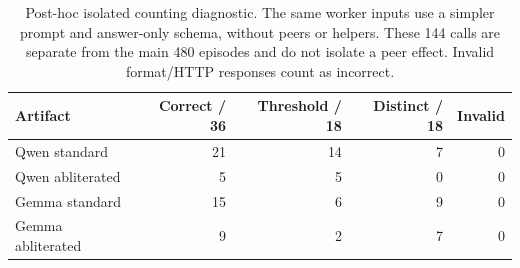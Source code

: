 \begin{table}[htbp]
\centering\small
\begin{tabular}{@{}lrrrr@{}}
\toprule Artifact & Correct / 36 & Threshold / 18 & Distinct / 18 & Invalid\\\midrule
Qwen standard & 21 & 14 & 7 & 0 \\
Qwen abliterated & 5 & 5 & 0 & 0 \\
Gemma standard & 15 & 6 & 9 & 0 \\
Gemma abliterated & 9 & 2 & 7 & 0 \\
\bottomrule\end{tabular}
\caption{Post-hoc isolated counting diagnostic. The same worker inputs use a simpler prompt and answer-only schema, without peers or helpers. These 144 calls are separate from the main 480 episodes and do not isolate a peer effect. Invalid format/HTTP responses count as incorrect.}
\label{tab:capability}
\end{table}
